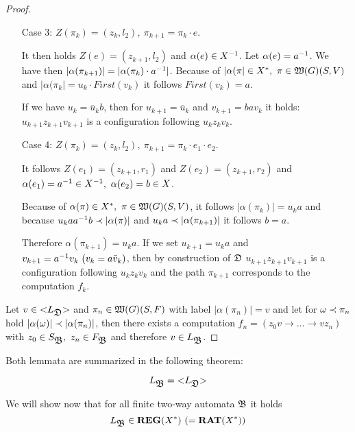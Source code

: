 \begin{proof}
\begin{itemize}
  \item[Case 3:] $Z(\pi_k) = (z_k, l_2),\ \pi_{k+1} = \pi_k \cdot e$.
  
  It then holds $Z(e) = (z_{k+1}, l_2)$ and $\alpha(e) \in {{X}^{-1}}$. Let
  $\alpha(e) = {{a}^{-1}}$. We have then $|\alpha(\pi_{k+1})| = |\alpha(\pi_k)
  \cdot {{a}^{-1}}|$. Because of $|\alpha(\pi| \in X^*,\ \pi \in \mbox{$\mathfrak{W}({G})$}(S, V)$
  and $|\alpha(\pi_k| = u_k \cdot First(v_k)$ it follows $First(v_k) = a$.
  
  If we have $u_k = \bar{u}_k b$, then for $u_{k+1} = \bar{u}_k$ and $v_{k+1} =
  b a v_k$ it holds: $u_{k+1} z_{k+1} v_{k+1}$ is a configuration following
  $u_{k} z_{k} v_{k}$.
  
  \item[Case 4:] $Z(\pi_k) = (z_k, l_2),\ \pi_{k+1} = \pi_k \cdot e_1 \cdot
  e_2$.
  
  It follows $Z(e_1) = (z_{k+1}, r_1)$ and $Z(e_2) = (z_{k+1}, r_2)$ and
  $\alpha(e_1) = \inv{a} \in \inv{X},\ \alpha(e_2) = b \in X$.
  
  Because of $\alpha(\pi) \in X^*,\ \pi \in \mbox{$\mathfrak{W}({G})$}(S, V)$, it follows
  $|\alpha(\pi_k)| = u_k a$ and because $u_k a {{a}^{-1}} b \prec |\alpha(\pi)|$
  and $u_k a \prec |\alpha(\pi_{k+1})|$ it follows $b = a$.
  
  Therefore $\alpha(\pi_{k+1}) = u_k a$. If we set $u_{k+1} = u_k a$ and
  $v_{k+1} = {{a}^{-1}} v_k\ (v_k = a \bar{v}_k)$, then by construction of $\mbox{$\mathfrak{D}$}$
  $u_{k+1} z_{k+1} v_{k+1}$ is a configuration following $u_{k} z_{k} v_{k}$ and
  the path $\pi_{k+1}$ corresponds to the computation $f_k$.
\end{itemize}

Let $v \in \mbox{${<}{L_{\mbox{$\mathfrak{D}$}}}{>}$}$ and $\pi_n \in \mbox{$\mathfrak{W}({G})$}(S, F)$ with label
$|\alpha(\pi_n)| = v$ and let for $\omega \prec \pi_n$ hold $|\alpha(\omega)|
\prec |\alpha(\pi_n)|$, then there exists a computation $f_n = (z_0 v \to
\ldots \to v z_n)$ with $z_0 \in S_{\mbox{$\mathfrak{B}$}},\ z_n \in F_{\mbox{$\mathfrak{B}$}}$ and therefore
$v \in L_{\mbox{$\mathfrak{B}$}}$.
\end{proof}

Both lemmata are summarized in the following theorem:

\begin{theorem}
\[ L_{\mbox{$\mathfrak{B}$}} = \mbox{${<}{L_{\mbox{$\mathfrak{D}$}}}{>}$} \]
\end{theorem}

\bigskip
We will show now that for all finite two-way automata $\mbox{$\mathfrak{B}$}$ it holds
\[ L_{\mbox{$\mathfrak{B}$}} \in \mbox{{\bf REG}}(X^*)\ (= \mbox{{\bf RAT}}(X^*)) \]

